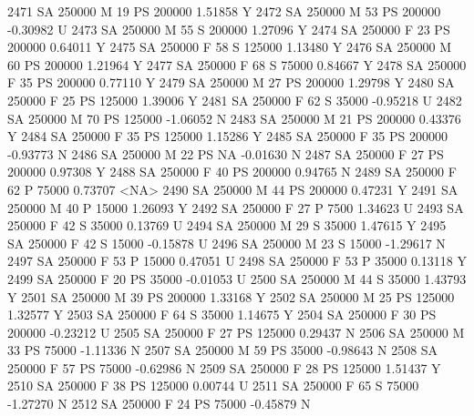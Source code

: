 \documentclass{article}
\begin{document}
\begin{Schunk}
\begin{Soutput}
2471     SA     250000   M  19        PS 200000   1.51858    Y
2472     SA     250000   M  53        PS 200000  -0.30982    U
2473     SA     250000   M  55         S 200000   1.27096    Y
2474     SA     250000   F  23        PS 200000   0.64011    Y
2475     SA     250000   F  58         S 125000   1.13480    Y
2476     SA     250000   M  60        PS 200000   1.21964    Y
2477     SA     250000   F  68         S  75000   0.84667    Y
2478     SA     250000   F  35        PS 200000   0.77110    Y
2479     SA     250000   M  27        PS 200000   1.29798    Y
2480     SA     250000   F  25        PS 125000   1.39006    Y
2481     SA     250000   F  62         S  35000  -0.95218    U
2482     SA     250000   M  70        PS 125000  -1.06052    N
2483     SA     250000   M  21        PS 200000   0.43376    Y
2484     SA     250000   F  35        PS 125000   1.15286    Y
2485     SA     250000   F  35        PS 200000  -0.93773    N
2486     SA     250000   M  22        PS     NA  -0.01630    N
2487     SA     250000   F  27        PS 200000   0.97308    Y
2488     SA     250000   F  40        PS 200000   0.94765    N
2489     SA     250000   F  62         P  75000   0.73707 <NA>
2490     SA     250000   M  44        PS 200000   0.47231    Y
2491     SA     250000   M  40         P  15000   1.26093    Y
2492     SA     250000   F  27         P   7500   1.34623    U
2493     SA     250000   F  42         S  35000   0.13769    U
2494     SA     250000   M  29         S  35000   1.47615    Y
2495     SA     250000   F  42         S  15000  -0.15878    U
2496     SA     250000   M  23         S  15000  -1.29617    N
2497     SA     250000   F  53         P  15000   0.47051    U
2498     SA     250000   F  53         P  35000   0.13118    Y
2499     SA     250000   F  20        PS  35000  -0.01053    U
2500     SA     250000   M  44         S  35000   1.43793    Y
2501     SA     250000   M  39        PS 200000   1.33168    Y
2502     SA     250000   M  25        PS 125000   1.32577    Y
2503     SA     250000   F  64         S  35000   1.14675    Y
2504     SA     250000   F  30        PS 200000  -0.23212    U
2505     SA     250000   F  27        PS 125000   0.29437    N
2506     SA     250000   M  33        PS  75000  -1.11336    N
2507     SA     250000   M  59        PS  35000  -0.98643    N
2508     SA     250000   F  57        PS  75000  -0.62986    N
2509     SA     250000   F  28        PS 125000   1.51437    Y
2510     SA     250000   F  38        PS 125000   0.00744    U
2511     SA     250000   F  65         S  75000  -1.27270    N
2512     SA     250000   F  24        PS  75000  -0.45879    N

\end{Soutput}
\end{Schunk}
\end{document}
